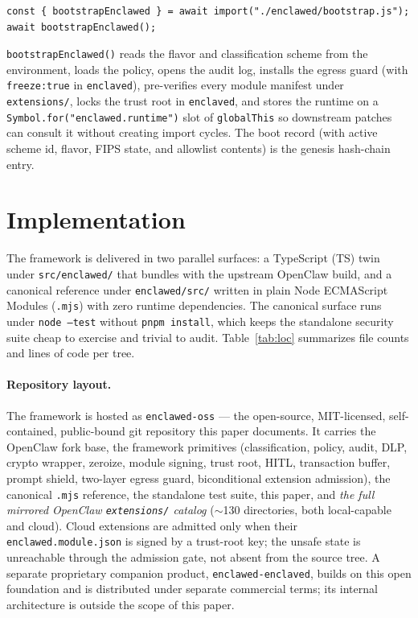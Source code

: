 \documentclass[11pt]{article}
\begin{document}
\begin{verbatim}
const { bootstrapEnclawed } = await import("./enclawed/bootstrap.js");
await bootstrapEnclawed();
\end{verbatim}

\texttt{bootstrapEnclawed()} reads the flavor and classification scheme
from the environment, loads the policy, opens the audit log, installs
the egress guard (with \texttt{freeze:true} in \texttt{enclaved}),
pre-verifies every module manifest under \texttt{extensions/}, locks the
trust root in \texttt{enclaved}, and stores the runtime on a
\texttt{Symbol.for("enclawed.runtime")} slot of \texttt{globalThis} so
downstream patches can consult it without creating import cycles. The
boot record (with active scheme id, flavor, FIPS state, and allowlist
contents) is the genesis hash-chain entry.

\section{Implementation}

The framework is delivered in two parallel surfaces: a TypeScript (TS)
twin under \texttt{src/enclawed/} that bundles with the upstream
OpenClaw build, and a canonical reference under \texttt{enclawed/src/}
written in plain Node ECMAScript Modules (\texttt{.mjs}) with zero
runtime dependencies. The
canonical surface runs under \texttt{node --test} without
\texttt{pnpm install}, which keeps the standalone security suite cheap to
exercise and trivial to audit. Table~\ref{tab:loc} summarizes file counts
and lines of code per tree.

\paragraph{Repository layout.} The framework is hosted as
\texttt{enclawed-oss} --- the open-source, MIT-licensed, self-contained,
public-bound git repository this paper documents. It carries the
OpenClaw fork base, the framework primitives (classification, policy,
audit, DLP, crypto wrapper, zeroize, module signing, trust root, HITL,
transaction buffer, prompt shield, two-layer egress guard, biconditional
extension admission), the canonical \texttt{.mjs} reference, the
standalone test suite, this paper, and \emph{the full mirrored OpenClaw
\texttt{extensions/} catalog} (\(\sim\)130 directories, both
local-capable and cloud). Cloud extensions are admitted only when their
\texttt{enclawed.module.json} is signed by a trust-root key; the unsafe
state is unreachable through the admission gate, not absent from the
source tree. A separate proprietary companion product,
\texttt{enclawed-enclaved}, builds on this open foundation and is
distributed under separate commercial terms; its internal architecture
is outside the scope of this paper.
\end{document}
